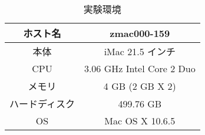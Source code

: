 \begin{table}[htb]
  \centering
  \caption{実験環境}
  \begin{tabular}{|c||c|} \hline
  	ホスト名	 & zmac000-159 \\ \hline
	本体 & iMac 21.5 インチ \\ \hline
	CPU	& 3.06 GHz Intel Core 2 Duo \\ \hline
	メモリ & 4 GB (2 GB X 2) \\ \hline
	ハードディスク	& 499.76 GB \\ \hline
	OS & Mac OS X 10.6.5 \\ \hline
  \end{tabular}
  \label{tab:information}
\end{table}
%
%
%
